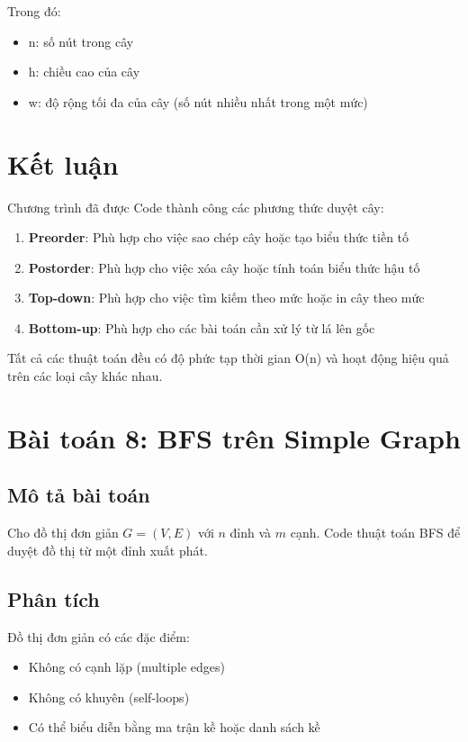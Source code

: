 \documentclass[12pt]{article}
\begin{document}
Trong đó:
\begin{itemize}
    \item n: số nút trong cây
    \item h: chiều cao của cây
    \item w: độ rộng tối đa của cây (số nút nhiều nhất trong một mức)
\end{itemize}
\section{Kết luận}
Chương trình đã được Code thành công các phương thức duyệt cây:
\begin{enumerate}
\item \textbf{Preorder}: Phù hợp cho việc sao chép cây hoặc tạo biểu thức tiền tố
\item \textbf{Postorder}: Phù hợp cho việc xóa cây hoặc tính toán biểu thức hậu tố
\item \textbf{Top-down}: Phù hợp cho việc tìm kiếm theo mức hoặc in cây theo mức
\item \textbf{Bottom-up}: Phù hợp cho các bài toán cần xử lý từ lá lên gốc
\end{enumerate}
Tất cả các thuật toán đều có độ phức tạp thời gian O(n) và hoạt động hiệu quả trên các loại cây khác nhau.
\section{Bài toán 8: BFS trên Simple Graph}
\subsection{Mô tả bài toán}
Cho đồ thị đơn giản $G = (V, E)$ với $n$ đỉnh và $m$ cạnh. Code thuật toán BFS để duyệt đồ thị từ một đỉnh xuất phát.
\subsection{Phân tích}
Đồ thị đơn giản có các đặc điểm:
\begin{itemize}
\item Không có cạnh lặp (multiple edges)
\item Không có khuyên (self-loops)
\item Có thể biểu diễn bằng ma trận kề hoặc danh sách kề
\end{itemize}
\end{document}
